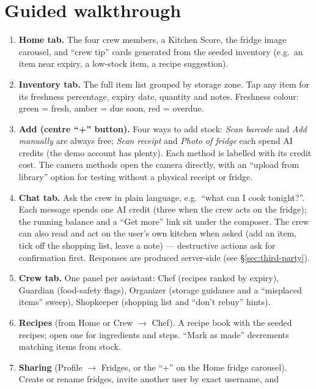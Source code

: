 \documentclass[11pt]{article}
\begin{document}
\section{Guided walkthrough}

\begin{enumerate}
  \item \textbf{Home tab.} The four crew members, a Kitchen Score, the fridge image
        carousel, and ``crew tip'' cards generated from the seeded inventory (e.g.\ an item
        near expiry, a low-stock item, a recipe suggestion).
  \item \textbf{Inventory tab.} The full item list grouped by storage zone. Tap any item
        for its freshness percentage, expiry date, quantity and notes. Freshness colour:
        green = fresh, amber = due soon, red = overdue.
  \item \textbf{Add (centre ``+'' button).} Four ways to add stock: \emph{Scan barcode} and
        \emph{Add manually} are always free; \emph{Scan receipt} and \emph{Photo of fridge}
        each spend AI credits (the demo account has plenty). Each method is labelled with its
        credit cost. The camera methods open the camera directly, with an ``upload from
        library'' option for testing without a physical receipt or fridge.
  \item \textbf{Chat tab.} Ask the crew in plain language, e.g.\ ``what can I cook
        tonight?''. Each message spends one AI credit (three when the crew acts on the fridge);
        the running balance and a ``Get more'' link sit under the composer. The crew can also
        read and act on the user's own kitchen when asked (add an item, tick off the shopping
        list, leave a note) --- destructive actions ask for confirmation first. Responses are
        produced server-side (see \S\ref{sec:third-party}).
  \item \textbf{Crew tab.} One panel per assistant: Chef (recipes ranked by expiry),
        Guardian (food-safety flags), Organizer (storage guidance and a ``misplaced items''
        sweep), Shopkeeper (shopping list and ``don't rebuy'' hints).
  \item \textbf{Recipes} (from Home or Crew $\rightarrow$ Chef). A recipe book with the
        seeded recipes; open one for ingredients and steps. ``Mark as made'' decrements
        matching items from stock.
  \item \textbf{Sharing} (Profile $\rightarrow$ Fridges, or the ``+'' on the Home fridge
        carousel). Create or rename fridges, invite another user by exact username, and

\end{enumerate}
\end{document}
